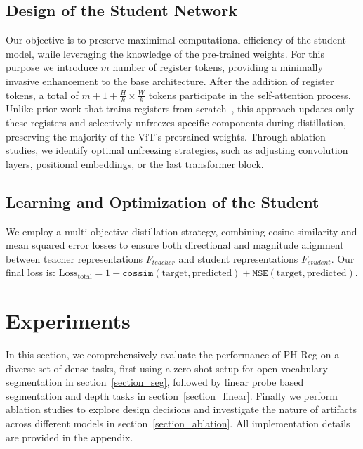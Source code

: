 \documentclass{article}
\begin{document}
\vspace{-.2cm}
\subsection{Design of the Student Network}
\label{student_method}
\vspace{-.2cm}
Our objective is to preserve maximimal computational efficiency of the student model, while leveraging the knowledge of the pre-trained weights. For this purpose we introduce $m$ number of register tokens, providing a minimally invasive enhancement to the base architecture. After the addition of register tokens, a total of $m + 1 + \frac{H}{k} \times \frac{W}{k}$ tokens participate in the self-attention process. Unlike prior work that trains registers from scratch~\citep{darcet2023vision}, this approach updates only these registers and selectively unfreezes specific components during distillation, preserving the majority of the ViT’s pretrained weights. Through ablation studies, we identify optimal unfreezing strategies, such as adjusting convolution layers, positional embeddings, or the last transformer block. 
\vspace{-.2cm}
\subsection{Learning and Optimization of the Student}
\label{learning_method}
\vspace{-.2cm}
We employ a multi-objective distillation strategy, combining cosine similarity and mean squared error losses to ensure both directional and magnitude alignment between teacher representations $F_{teacher}$ and student representations $F_{student}$. Our final loss is: $\text{Loss}_{\text{total}} = \text{1} -\texttt{cossim}(\text{target}, \text{predicted}) + \texttt{MSE}(\text{target}, \text{predicted})$.
 \vspace{-.2cm}
\section{Experiments}
\vspace{-.2cm}
In this section, we comprehensively evaluate the performance of PH-Reg on a diverse set of dense tasks, first using a zero-shot setup for open-vocabulary segmentation in section~\ref{section_seg}, followed by linear probe based segmentation and depth tasks in section~\ref{section_linear}. Finally we perform ablation studies to explore design decisions and investigate the nature of artifacts across different models in section~\ref{section_ablation}.
All implementation details are provided in the appendix. 
\end{document}
